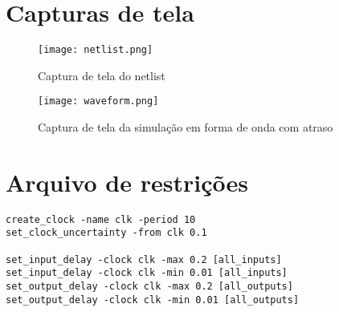 \documentclass[12pt, fleqn]{article}
\begin{document}
\section{Capturas de tela}

\begin{figure}[H]
    \texttt{[image: netlist.png]}
    \caption{Captura de tela do netlist}
\end{figure}

\begin{figure}[H]
    
    \texttt{[image: waveform.png]}
    \caption{Captura de tela da simulação em forma de onda com atraso}
\end{figure}

\section{Arquivo de restrições}

\begin{lstlisting}[caption=constraints.sdc]
create_clock -name clk -period 10
set_clock_uncertainty -from clk 0.1

set_input_delay -clock clk -max 0.2 [all_inputs]
set_input_delay -clock clk -min 0.01 [all_inputs]
set_output_delay -clock clk -max 0.2 [all_outputs]
set_output_delay -clock clk -min 0.01 [all_outputs]    
\end{lstlisting}
\end{document}
